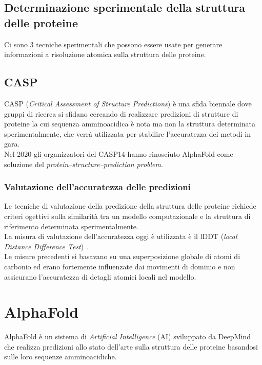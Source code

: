 \section{Determinazione sperimentale della struttura delle proteine}

Ci sono 3 tecniche sperimentali che possono essere usate per generare informazioni a risoluzione atomica sulla struttura delle proteine.

\section{CASP}
CASP (\textit{Critical Assessment of Structure Predictions}) è una sfida biennale dove gruppi di ricerca si sfidano cercando di realizzare predizioni di strutture di proteine la cui sequenza amminoacidica è nota ma non la struttura determinata sperimentalmente, che verrà utilizzata per stabilire l'accuratezza dei metodi in gara. \\

Nel 2020 gli organizzatori del CASP14 hanno rinosciuto AlphaFold come soluzione del \textit{protein–structure–prediction problem}. \\

\subsection{Valutazione dell'accuratezza delle predizioni}

Le tecniche di valutazione della predizione della struttura delle proteine richiede criteri ogettivi sulla similarità tra un modello computazionale e la struttura di riferimento determinata sperimentalmente.\\

La misura di valutazione dell'accuratezza oggi è utilizzata è il lDDT (\textit{local Distance
	Difference Test}) \cite{mariani2013lddt}. \\

Le misure precedenti si basavano su una superposizione globale di atomi di carbonio ed erano fortemente influenzate dai movimenti di dominio e non assicurano l'accuratezza di detagli atomici locali nel modello.



\chapter{AlphaFold}
AlphaFold è un sistema di \textit{Artificial Intelligence }(AI) sviluppato da DeepMind che realizza predizioni allo stato dell'arte sulla struttura delle proteine basandosi sulle loro sequenze amminoacidiche.


